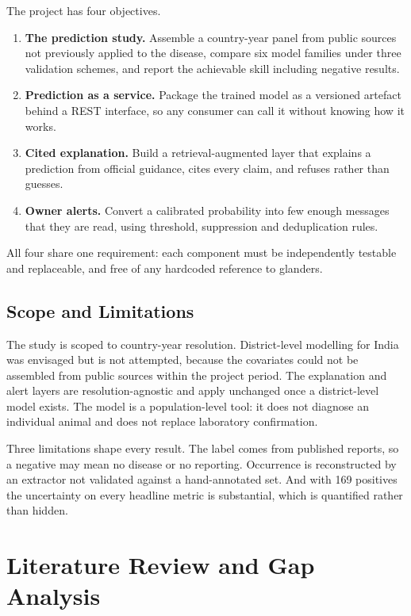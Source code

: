\documentclass[10pt,openany]{report}
\begin{document}
The project has four objectives.

\begin{enumerate}
  \item \textbf{The prediction study.} Assemble a country-year panel from public sources not previously applied
        to the disease, compare six model families under three validation schemes, and report the
        achievable skill including negative results.
  \item \textbf{Prediction as a service.} Package the trained model as a versioned artefact behind a
        REST interface, so any consumer can call it without knowing how it works.
  \item \textbf{Cited explanation.} Build a retrieval-augmented layer that explains a prediction from
        official guidance, cites every claim, and refuses rather than guesses.
  \item \textbf{Owner alerts.} Convert a calibrated probability into few enough messages that they
        are read, using threshold, suppression and deduplication rules.
\end{enumerate}

All four share one requirement: each component must be independently testable and replaceable, and
free of any hardcoded reference to glanders.

\section{Scope and Limitations}

The study is scoped to country-year resolution. District-level modelling for India was envisaged but
is not attempted, because the covariates could not be assembled from public sources within the project
period. The explanation and alert layers are resolution-agnostic and apply unchanged once a
district-level model exists. The model is a population-level tool: it does not diagnose an individual
animal and does not replace laboratory confirmation.

Three limitations shape every result. The label comes from published reports, so a negative may mean
no disease or no reporting. Occurrence is reconstructed by an extractor not validated against a
hand-annotated set. And with 169 positives the uncertainty on every headline metric is substantial,
which is quantified rather than hidden.

\chapter{Literature Review and Gap Analysis}
\label{ch:lit}
\end{document}
